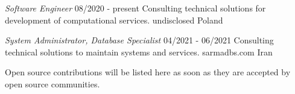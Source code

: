 \documentclass[a4paper,12pt]{memoir} %
\begin{document}


{\textit{Software Engineer}}
{08/2020 - present}
{Consulting technical solutions for development of computational services.}
{undisclosed}
{Poland}


{\textit{System Administrator, Database Specialist}}
{04/2021 - 06/2021}
{Consulting technical solutions to maintain systems and services.}
{sarmadbs.com}
{Iran}


\Sep %




Open source contributions will be listed here as soon as they are accepted by open source communities.


\Sep %


\clearpage %

\userinformation %

\framebreak %

\end{document}
